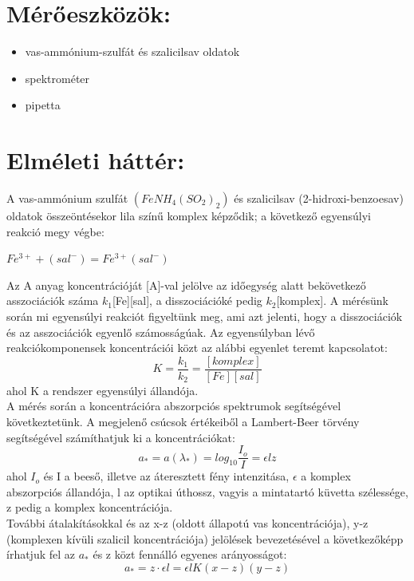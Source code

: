 \documentclass[20pt]{article}
\numberwithin{equation}{section}
\numberwithin{figure}{section}
\numberwithin{table}{section}
\begin{document}
	\section{Mérőeszközök:}
	\begin{itemize}
		\item vas-ammónium-szulfát és szalicilsav oldatok
		\item spektrométer
		\item pipetta
	\end{itemize}
	
	\section{Elméleti háttér:}
	A vas-ammónium szulfát $(FeNH_{4}(SO_{2})_{2})$ és szalicilsav (2-hidroxi-benzoesav) oldatok összeöntésekor lila színű komplex képződik; a következő egyensúlyi reakció megy végbe:
	\begin{center}
		$Fe^{3+}+(sal^{-})=Fe^{3+}(sal^{-})$
	\end{center}
	Az A anyag koncentrációját [A]-val jelölve az időegység alatt bekövetkező asszociációk száma $k_{1}$[Fe][sal], a disszociációké pedig $k_{2}$[komplex]. A mérésünk során mi egyensúlyi reakciót figyeltünk meg, ami azt jelenti, hogy a disszociációk és az asszociációk egyenlő számosságúak. Az egyensúlyban lévő reakciókomponensek koncentrációi közt az alábbi egyenlet teremt kapcsolatot:
	\begin{equation}
	K=\frac{k_{1}}{k_{2}}=\frac{[komplex]}{[Fe][sal]}
	\end{equation}
	ahol K a rendszer egyensúlyi állandója.\\
	A mérés során a koncentrációra abszorpciós spektrumok segítségével következtetünk. A megjelenő csúcsok értékeiből a Lambert-Beer törvény segítségével számíthatjuk ki a koncentrációkat:
	\begin{equation}
	a_{*}=a(\lambda_{*})=log_{10}\frac{I_{o}}{I}=\epsilon lz
	\end{equation} 
	ahol $I_{o}$ és I a beeső, illetve az áteresztett fény intenzitása, $\epsilon$ a komplex abszorpciós állandója, l az optikai úthossz, vagyis a mintatartó küvetta szélessége, z pedig a komplex koncentrációja.\\
	További átalakításokkal és az x-z (oldott állapotú vas koncentrációja), y-z (komplexen kívüli szalicil koncentrációja) jelölések bevezetésével a következőképp írhatjuk fel az $a_{*}$ és z közt fennálló egyenes arányosságot:
	\begin{equation}
	a_{*}=z\cdot\epsilon l=\epsilon lK(x-z)(y-z)
	\end{equation}
\end{document}

